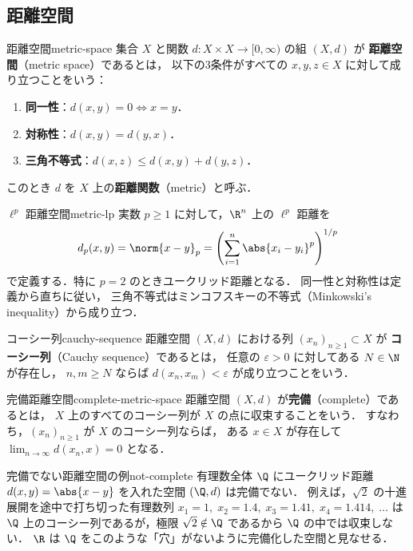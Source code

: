 \subsection{距離空間}
\label{subsec:metric-space}

\begin{definition}{距離空間}{metric-space}
  集合 $X$ と関数 $d \colon X \times X \to [0, \infty)$ の組 $(X, d)$ が
  \textbf{距離空間}（metric space）であるとは，
  以下の3条件がすべての $x, y, z \in X$ に対して成り立つことをいう：
  \begin{enumerate}
    \item \textbf{同一性}：$d(x, y) = 0 \iff x = y$．
    \item \textbf{対称性}：$d(x, y) = d(y, x)$．
    \item \textbf{三角不等式}：$d(x, z) \leq d(x, y) + d(y, z)$．
  \end{enumerate}
  このとき $d$ を $X$ 上の\textbf{距離関数}（metric）と呼ぶ．
\end{definition}

\begin{example}{$\ell^p$ 距離空間}{metric-lp}
  実数 $p \geq 1$ に対して，$\R^n$ 上の $\ell^p$ 距離を
  \[
    d_p(x, y) = \norm{x - y}_p
    = \left(\sum_{i=1}^n \abs{x_i - y_i}^p\right)^{1/p}
  \]
  で定義する．特に $p = 2$ のときユークリッド距離となる．
  同一性と対称性は定義から直ちに従い，
  三角不等式はミンコフスキーの不等式（Minkowski's inequality）から成り立つ．
\end{example}

\begin{definition}{コーシー列}{cauchy-sequence}
  距離空間 $(X, d)$ における列 $(x_n)_{n \geq 1} \subset X$ が
  \textbf{コーシー列}（Cauchy sequence）であるとは，
  任意の $\varepsilon > 0$ に対してある $N \in \N$ が存在し，
  $n, m \geq N$ ならば $d(x_n, x_m) < \varepsilon$ が成り立つことをいう．
\end{definition}

\begin{definition}{完備距離空間}{complete-metric-space}
  距離空間 $(X, d)$ が\textbf{完備}（complete）であるとは，
  $X$ 上のすべてのコーシー列が $X$ の点に収束することをいう．
  すなわち，$(x_n)_{n \geq 1}$ が $X$ のコーシー列ならば，
  ある $x \in X$ が存在して $\lim_{n \to \infty} d(x_n, x) = 0$ となる．
\end{definition}

\begin{remark}{完備でない距離空間の例}{not-complete}
  有理数全体 $\Q$ にユークリッド距離 $d(x,y) = \abs{x - y}$ を入れた空間 $(\Q, d)$ は完備でない．
  例えば，$\sqrt{2}$ の十進展開を途中で打ち切った有理数列
  $x_1 = 1,\; x_2 = 1.4,\; x_3 = 1.41,\; x_4 = 1.414,\; \ldots$
  は $\Q$ 上のコーシー列であるが，極限 $\sqrt{2} \notin \Q$ であるから
  $\Q$ の中では収束しない．
  $\R$ は $\Q$ をこのような「穴」がないように完備化した空間と見なせる．
\end{remark}

